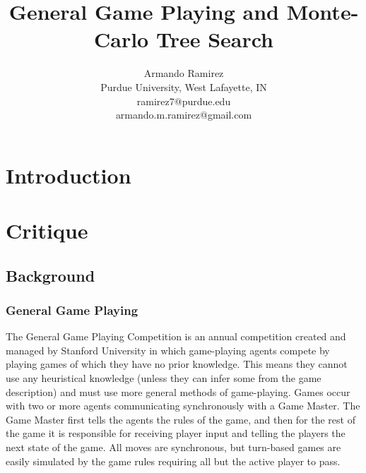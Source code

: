 \documentclass[letterpaper]{article}
\title{General Game Playing and Monte-Carlo Tree Search}
\author{Armando Ramirez \\ Purdue University, West Lafayette, IN \\ ramirez7@purdue.edu \\ armando.m.ramirez@gmail.com}
\begin{document}
\maketitle

\section{Introduction}

\section{Critique}

\subsection{Background}

\subsubsection{General Game Playing}
The General Game Playing Competition is an annual competition created and managed by Stanford University in which game-playing agents compete by playing games of which they have no prior knowledge.\cite{StanfordGGP} This means they cannot use any heuristical knowledge (unless they can infer some from the game description) and must use more general methods of game-playing. Games occur with two or more agents communicating synchronously with a Game Master. The Game Master first tells the agents the rules of the game, and then for the rest of the game it is responsible for receiving player input and telling the players the next state of the game. All moves are synchronous, but turn-based games are easily simulated by the game rules requiring all but the active player to pass.
\end{document}
